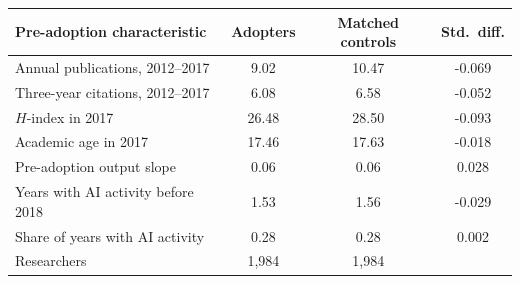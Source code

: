 \begin{tabular}{lccc}
\toprule
Pre-adoption characteristic & Adopters & Matched controls & Std.\ diff. \\
\midrule
Annual publications, 2012--2017 & 9.02 & 10.47 & -0.069 \\
Three-year citations, 2012--2017 & 6.08 & 6.58 & -0.052 \\
$H$-index in 2017 & 26.48 & 28.50 & -0.093 \\
Academic age in 2017 & 17.46 & 17.63 & -0.018 \\
Pre-adoption output slope & 0.06 & 0.06 & 0.028 \\
Years with AI activity before 2018 & 1.53 & 1.56 & -0.029 \\
Share of years with AI activity & 0.28 & 0.28 & 0.002 \\
\midrule
Researchers & 1,984 & 1,984 & \\
\bottomrule
\end{tabular}
